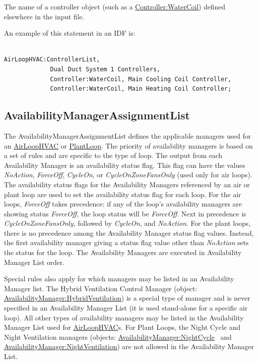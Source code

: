 The name of a controller object (such as a \hyperref[controllerwatercoil]{Controller:WaterCoil}) defined elsewhere in the input file.

An example of this statement in an IDF is:

\begin{lstlisting}

AirLoopHVAC:ControllerList,
             Dual Duct System 1 Controllers,
             Controller:WaterCoil, Main Cooling Coil Controller,
             Controller:WaterCoil, Main Heating Coil Controller;
\end{lstlisting}

\subsection{AvailabilityManagerAssignmentList}\label{availabilitymanagerassignmentlist}

The AvailabilityManagerAssignmentList defines the applicable managers used for an \hyperref[airloophvac]{AirLoopHVAC} or \hyperref[plantloop]{PlantLoop}. The priority of availability managers is based on a set of rules and are specific to the type of loop. The output from each Availability Manager is an availability status flag. This flag can have the values \emph{NoAction}, \emph{ForceOff}, \emph{CycleOn}, or \emph{CycleOnZoneFansOnly} (used only for air loops). The availability status flags for the Availability Managers referenced by an air or plant loop are used to set the availability status flag for each loop. For the air loops, \emph{ForceOff} takes precedence: if any of the loop's availability managers are showing status \emph{ForceOff}, the loop status will be \emph{ForceOff}. Next in precedence is \emph{CycleOnZoneFansOnly,} followed by \emph{CycleOn}, and \emph{NoAction}. For the plant loops, there is no precedence among the Availability Manager status flag values. Instead, the first availability manager giving a status flag value other than \emph{NoAction} sets the status for the loop. The Availability Managers are executed in Availability Manager List order.

Special rules also apply for which managers may be listed in an Availability Manager list. The Hybrid Ventilation Control Manager (object: \hyperref[availabilitymanagerhybridventilation]{AvailabilityManager:HybridVentilation}) is a special type of manager and is never specified in an Availability Manager List (it is used stand-alone for a specific air loop). All other types of availability managers may be listed in the Availability Manager List used for \hyperref[airloophvac]{AirLoopHVAC}s. For Plant Loops, the Night Cycle and Night Ventilation managers (objects: \hyperref[availabilitymanagernightcycle]{AvailabilityManager:NightCycle} ~and \hyperref[availabilitymanagernightventilation]{AvailabilityManager:NightVentilation}) are not allowed in the Availability Manager List.

